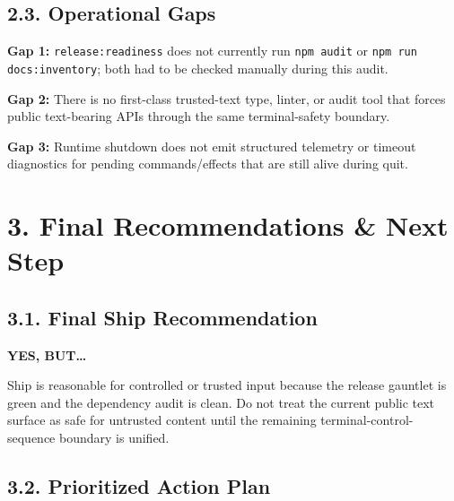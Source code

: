 \subsection{2.3. Operational Gaps}\label{record-418-operational-gaps}

\textbf{Gap 1:} \texttt{r\allowbreak{}e\allowbreak{}l\allowbreak{}e\allowbreak{}a\allowbreak{}s\allowbreak{}e\allowbreak{}:\allowbreak{}r\allowbreak{}e\allowbreak{}a\allowbreak{}d\allowbreak{}i\allowbreak{}n\allowbreak{}e\allowbreak{}s\allowbreak{}s} does not currently run \texttt{n\allowbreak{}p\allowbreak{}m\allowbreak{} \allowbreak{}a\allowbreak{}u\allowbreak{}d\allowbreak{}i\allowbreak{}t} or \texttt{n\allowbreak{}p\allowbreak{}m\allowbreak{} \allowbreak{}r\allowbreak{}u\allowbreak{}n\allowbreak{} \allowbreak{}d\allowbreak{}o\allowbreak{}c\allowbreak{}s\allowbreak{}:\allowbreak{}i\allowbreak{}n\allowbreak{}v\allowbreak{}e\allowbreak{}n\allowbreak{}t\allowbreak{}o\allowbreak{}r\allowbreak{}y}; both had to be checked manually during this audit.

\textbf{Gap 2:} There is no first-class trusted-text type, linter, or audit tool that forces public text-bearing APIs through the same terminal-safety boundary.

\textbf{Gap 3:} Runtime shutdown does not emit structured telemetry or timeout diagnostics for pending commands/effects that are still alive during quit.

\section{3. Final Recommendations \& Next Step}\label{record-418-final-recommendations-next-step}

\subsection{3.1. Final Ship Recommendation}\label{record-418-final-ship-recommendation}

\textbf{YES, BUT\ldots{}}

Ship is reasonable for controlled or trusted input because the release gauntlet is green and the dependency audit is clean. Do not treat the current public text surface as safe for untrusted content until the remaining terminal-control-sequence boundary is unified.

\subsection{3.2. Prioritized Action Plan}\label{record-418-prioritized-action-plan}

